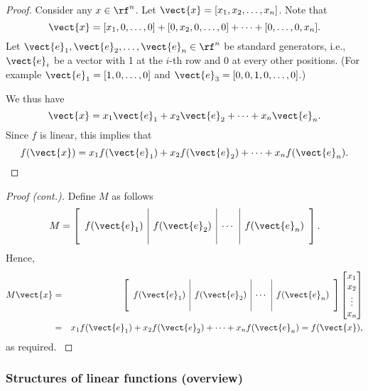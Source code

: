 \begin{frame}

    \begin{proof}
      Consider any $x\in\rf^n$.
      Let $\vect{x}=[x_1,x_2,\ldots,x_n]$.  Note that
      \[
      \vect{x}=[x_1,0,\ldots,0] + [0,x_2,0,\ldots,0] + \cdots + [0,\ldots,0,x_n].
      \]
      Let $\vect{e}_1,\vect{e}_2,\ldots,\vect{e}_n\in\rf^n$ be standard
      generators, i.e., $\vect{e}_i$ be a vector with 1 at the $i$-th row
      and 0 at every other positions.  (For example
      $\vect{e}_1=[1,0,\ldots,0]$ and $\vect{e}_3=[0,0,1,0,\ldots,0]$.)

      We thus have
      \[
      \vect{x}=x_1\vect{e}_1 + x_2\vect{e}_2 + \cdots + x_n\vect{e}_n.
      \]
      Since $f$ is linear, this implies that
      \[
      f(\vect{x}) = x_1f(\vect{e}_1) + x_2f(\vect{e}_2) + \cdots + x_nf(\vect{e}_n).
      \]
    \end{proof}
\end{frame}

\begin{frame}
  \begin{proof}[Proof (cont.)]
    {\small
      Define $M$ as follows
      \[
      M=\left[
        \begin{array}{c|c|c|c}
          & & &  \\
          f(\vect{e}_1) &
          f(\vect{e}_2) &
          \cdots &
          f(\vect{e}_n) \\
          & & & 
        \end{array}
        \right].
      \]
      Hence,
      \begin{eqnarray*}
        M\vect{x} &=& \left[
          \begin{array}{c|c|c|c}
            & & &  \\
            f(\vect{e}_1) &
            f(\vect{e}_2) &
            \cdots &
            f(\vect{e}_n) \\
            & & & 
          \end{array}
          \right]
        \begin{bmatrix}
          x_1 \\
          x_2 \\
          \vdots \\
          x_n
        \end{bmatrix} \\
        &=&
        x_1f(\vect{e}_1) + x_2f(\vect{e}_2) + \cdots + x_nf(\vect{e}_n)
        = f(\vect{x}),
      \end{eqnarray*}
      as required.
    }
  \end{proof}
\end{frame}

\begin{frame}
  \frametitle{Structures of linear functions (overview)}
\end{frame}

